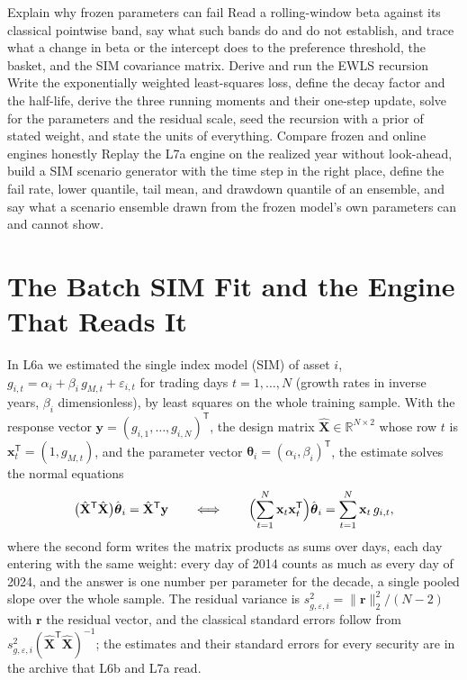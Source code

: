 \documentclass[11pt]{article}
\newcommand{\R}{\mathbb{R}}
\newcommand{\bx}{\mathbf x}
\newcommand{\by}{\mathbf y}
\newcommand{\bX}{\hat{\mathbf X}}
\newcommand{\bth}{\boldsymbol\theta}
\begin{document}

\learningobjectives
  {Explain why frozen parameters can fail}
  {Read a rolling-window beta against its classical pointwise band, say what such bands do and do not establish, and trace what a change in beta or the intercept does to the preference threshold, the basket, and the SIM covariance matrix.}
  {Derive and run the EWLS recursion}
  {Write the exponentially weighted least-squares loss, define the decay factor and the half-life, derive the three running moments and their one-step update, solve for the parameters and the residual scale, seed the recursion with a prior of stated weight, and state the units of everything.}
  {Compare frozen and online engines honestly}
  {Replay the L7a engine on the realized year without look-ahead, build a SIM scenario generator with the time step in the right place, define the fail rate, lower quantile, tail mean, and drawdown quantile of an ensemble, and say what a scenario ensemble drawn from the frozen model's own parameters can and cannot show.}

\section{The Batch SIM Fit and the Engine That Reads It}

In L6a we estimated the single index model (SIM) of asset $i$, $g_{i,t}=\alpha_i+\beta_i\,g_{M,t}+\varepsilon_{i,t}$ for trading days $t=1,\ldots,N$ (growth rates in inverse years, $\beta_i$ dimensionless), by least squares on the whole training sample. With the response vector $\by=(g_{i,1},\ldots,g_{i,N})^{\mathsf T}$, the design matrix $\bX\in\R^{N\times2}$ whose row $t$ is $\bx_t^{\mathsf T}=(1,g_{M,t})$, and the parameter vector $\bth_i=(\alpha_i,\beta_i)^{\mathsf T}$, the estimate solves the normal equations
\begin{equation}
  \label{eq:ols}
  \bigl(\bX^{\mathsf T}\bX\bigr)\hat{\bth}_i=\bX^{\mathsf T}\by
  \qquad\Longleftrightarrow\qquad
  \Bigl(\sum_{t=1}^{N}\bx_t\bx_t^{\mathsf T}\Bigr)\hat{\bth}_i=\sum_{t=1}^{N}\bx_t\,g_{i,t},
\end{equation}
where the second form writes the matrix products as sums over days, each day entering with the same weight: every day of 2014 counts as much as every day of 2024, and the answer is one number per parameter for the decade, a single pooled slope over the whole sample. The residual variance is $s^2_{g,\varepsilon,i}=\lVert\mathbf r\rVert_2^2/(N-2)$ with $\mathbf r$ the residual vector, and the classical standard errors follow from $s^2_{g,\varepsilon,i}(\bX^{\mathsf T}\bX)^{-1}$; the estimates and their standard errors for every security are in the archive that L6b and L7a read.
\end{document}
